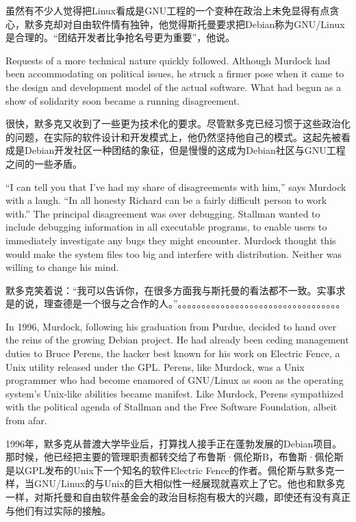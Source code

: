 \ifdefined\chs
虽然有不少人觉得把Linux看成是GNU工程的一个变种在政治上未免显得有点贪心，默多克却对自由软件情有独钟，他觉得斯托曼要求把Debian称为GNU/Linux是合理的。``团结开发者比争抢名号更为重要''，他说。
\fi

\ifdefined\eng
Requests of a more technical nature quickly followed. Although Murdock had been accommodating on political issues, he struck a firmer pose when it came to the design and development model of the actual software. What had begun as a show of solidarity soon became a running disagreement.
\fi

\ifdefined\chs
很快，默多克又收到了一些更为技术化的要求。尽管默多克已经习惯于这些政治化的问题，在实际的软件设计和开发模式上，他仍然坚持他自己的模式。这起先被看成是Debian开发社区一种团结的象征，但是慢慢的这成为Debian社区与GNU工程之间的一些矛盾。
\fi

\ifdefined\eng
``I can tell you that I've had my share of disagreements with him,'' says Murdock with a laugh. ``In all honesty Richard can be a fairly difficult person to work with.''  The principal disagreement was over debugging.  Stallman wanted to include debugging information in all executable programs, to enable users to immediately investigate any bugs they might encounter.  Murdock thought this would make the system files too big and interfere with distribution.  Neither was willing to change his mind.
\fi

\ifdefined\chs
默多克笑着说：``我可以告诉你，在很多方面我与斯托曼的看法都不一致。实事求是的说，理查德是一个很与之合作的人。''。。。。。。。。。。。。。。。。。。。。。。。。。。。。。。。。。。
\fi

\ifdefined\eng
In 1996, Murdock, following his graduation from Purdue, decided to hand over the reins of the growing Debian project. He had already been ceding management duties to Bruce Perens, the hacker best known for his work on Electric Fence, a Unix utility released under the GPL. Perens, like Murdock, was a Unix programmer who had become enamored of GNU/Linux as soon as the operating system's Unix-like abilities became manifest. Like Murdock, Perens sympathized with the political agenda of Stallman and the Free Software Foundation, albeit from afar.
\fi

\ifdefined\chs
1996年，默多克从普渡大学毕业后，打算找人接手正在蓬勃发展的Debian项目。那时候，他已经把主要的管理职责都转交给了布鲁斯·佩伦斯B，布鲁斯·佩伦斯是以GPL发布的Unix下一个知名的软件Electric Fence的作者。佩伦斯与默多克一样，当GNU/Linux的与Unix的巨大相似性一经展现就喜欢上了它。他也和默多克一样，对斯托曼和自由软件基金会的政治目标抱有极大的兴趣，即使还有没有真正与他们有过实际的接触。
\fi


